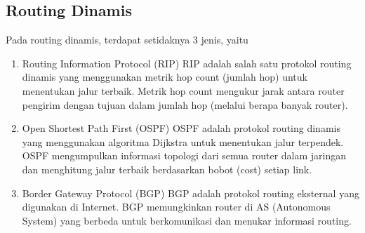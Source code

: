 \subsection{Routing Dinamis}
Pada routing dinamis, terdapat setidaknya 3 jenis, yaitu
\begin{enumerate}
	\item Routing Information Protocol (RIP) RIP adalah salah satu protokol routing dinamis yang menggunakan metrik hop count (jumlah hop) untuk menentukan jalur terbaik. Metrik hop count mengukur jarak antara router pengirim dengan tujuan dalam jumlah hop (melalui berapa banyak router).
	\item Open Shortest Path First (OSPF) OSPF adalah protokol routing dinamis yang menggunakan algoritma Dijkstra untuk menentukan jalur terpendek. OSPF mengumpulkan informasi topologi dari semua router dalam jaringan dan menghitung jalur terbaik berdasarkan bobot (cost) setiap link.
	\item Border Gateway Protocol (BGP) BGP adalah protokol routing eksternal yang digunakan di Internet. BGP memungkinkan router di AS (Autonomous System) yang berbeda untuk berkomunikasi dan menukar informasi routing.
\end{enumerate}

